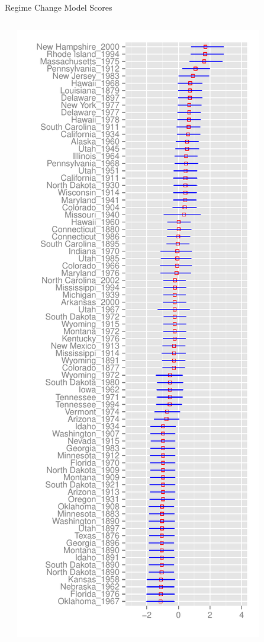 \documentclass[compress]{beamer}
\makeatletter
\newcounter{acolumn}%
\let\column\@acolumn
\let\column\@@acolumn
\makeatother
\begin{document}
\begin{frame}{Regime Change Model Scores}
\begin{columns}[c]
\begin{center}
		\end{center}
		\column{1.5in}
		\begin{center}
			\includegraphics[scale=.3]{graphics/regime/regime_param_mean_second_ggplot}
		\end{center}
	\end{columns}
\end{frame}
\end{document}
